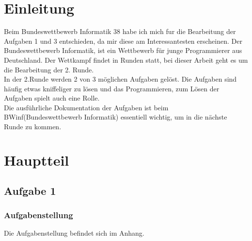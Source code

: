\documentclass[a4paper,12pt,arial]{scrartcl}
\begin{document}
\section{Einleitung}
Beim Bundeswettbewerb Informatik 38 habe ich mich fur die Bearbeitung der Aufgaben 1 und 3 entschieden, da mir diese am Interessantesten erscheinen. Der Bundeswettbewerb Informatik, ist ein Wettbewerb für junge Programmierer aus Deutschland. Der Wettkampf findet in Runden statt, bei dieser Arbeit geht es um die Bearbeitung der 2. Runde.
\\
In der 2.Runde werden 2 von 3 möglichen Aufgaben gelöst. Die Aufgaben sind häufig etwas kniffeliger zu lösen und das Programmieren, zum Lösen der Aufgaben spielt auch eine Rolle.\\
Die ausführliche Dokumentation der Aufgaben ist beim BWinf(Bundeswettbewerb Informatik) essentiell wichtig, um in die nächste Runde zu kommen.
\section{Hauptteil}
\newpage
\subsection{Aufgabe 1}
\subsubsection{Aufgabenstellung}
Die Aufgabenstellung befindet sich im Anhang.
\end{document}
